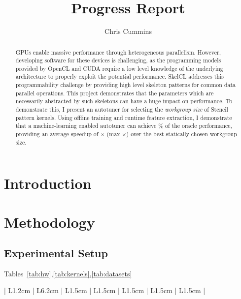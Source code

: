 
\title{Progress Report}

\author{Chris Cummins}





\maketitle

\begin{abstract}
  \noindent
  GPUs enable massive performance through heterogeneous
  parallelism. However, developing software for these devices is
  challenging, as the programming models provided by OpenCL and CUDA
  require a low level knowledge of the underlying architecture to
  properly exploit the potential performance. SkelCL addresses this
  programmability challenge by providing high level skeleton patterns
  for common data parallel operations. This project demonstrates that
  the parameters which are necessarily abstracted by such skeletons
  can have a huge impact on performance. To demonstrate this, I
  present an autotuner for selecting the \emph{workgroup size} of
  Stencil pattern kernels. Using offline training and runtime feature
  extraction, I demonstrate that a machine-learning enabled autotuner
  can achieve \% of the oracle performance, providing an
  average speedup of $\times$ (max $\times$) over
  the best statically chosen workgroup size.
\end{abstract}

\section{Introduction}

\section{Methodology}


\subsection{Experimental Setup}

Tables~\ref{tab:hw},\ref{tab:kernels},\ref{tab:datasets}

\begin{table}
\footnotesize
\centering
\begin{tabular}{| L{1.2cm} | L{6.2cm} | L{1.5cm} | L{1.5cm} | L{1.5cm} | L{1.5cm} | L{1.5cm} |}
\hline

\hline
\end{tabular}
\caption{%
  Execution devices. %
}
\label{tab:hw}
\end{table}

